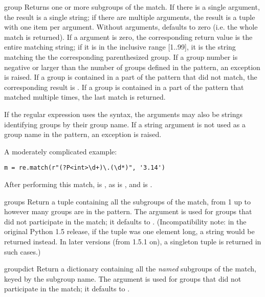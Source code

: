 \begin{methoddesc}[MatchObject]{group}{}
Returns one or more subgroups of the match.  If there is a single
argument, the result is a single string; if there are
multiple arguments, the result is a tuple with one item per argument.
Without arguments,  defaults to zero (i.e. the whole match
is returned).
If a  argument is zero, the corresponding return value is the
entire matching string; if it is in the inclusive range [1..99], it is
the string matching the the corresponding parenthesized group.  If a
group number is negative or larger than the number of groups defined
in the pattern, an  exception is raised.
If a group is contained in a part of the pattern that did not match,
the corresponding result is .  If a group is contained in a 
part of the pattern that matched multiple times, the last match is
returned.

If the regular expression uses the  syntax,
the  arguments may also be strings identifying groups by
their group name.  If a string argument is not used as a group name in 
the pattern, an  exception is raised.

A moderately complicated example:

\begin{verbatim}
m = re.match(r"(?P<int>\d+)\.(\d*)", '3.14')
\end{verbatim}

After performing this match,  is , as is
, and  is .
\end{methoddesc}

\begin{methoddesc}[MatchObject]{groups}{}
Return a tuple containing all the subgroups of the match, from 1 up to
however many groups are in the pattern.  The  argument is
used for groups that did not participate in the match; it defaults to
.  (Incompatibility note: in the original Python 1.5
release, if the tuple was one element long, a string would be returned
instead.  In later versions (from 1.5.1 on), a singleton tuple is
returned in such cases.)
\end{methoddesc}

\begin{methoddesc}[MatchObject]{groupdict}{}
Return a dictionary containing all the \emph{named} subgroups of the
match, keyed by the subgroup name.  The  argument is
used for groups that did not participate in the match; it defaults to
.
\end{methoddesc}

